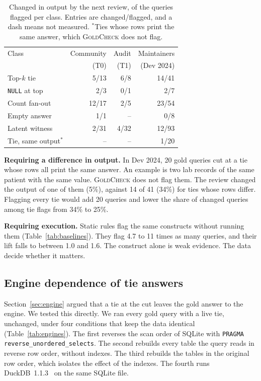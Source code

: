 \documentclass[conference]{IEEEtran}
\newcommand{\sys}{\textsc{GoldCheck}}
\begin{document}
\begin{table}[t]
\caption{Changed in output by the next review, of the queries flagged per class.
Entries are changed/flagged, and a dash means not measured. $^{*}$Ties whose rows print the same answer, which \sys{} does not flag.}
\label{tab:perclass}
\centering
\footnotesize
\setlength{\tabcolsep}{3.5pt}
\begin{tabular}{@{}lrrr@{}}
\toprule
Class & Community & Audit & Maintainers \\
 & (T0) & (T1) & (Dev 2024) \\
\midrule
Top-$k$ tie & 5/13 & 6/8 & 14/41 \\
\texttt{NULL} at top & 2/3 & 0/1 & 2/7 \\
Count fan-out & 12/17 & 2/5 & 23/54 \\
Empty answer & 1/1 & -- & 0/8 \\
\midrule
Latent witness & 2/31 & 4/32 & 12/93 \\
Tie, same output$^{*}$ & -- & -- & 1/20 \\
\bottomrule
\end{tabular}
\end{table}

\textbf{Requiring a difference in output.} In Dev 2024, 20 gold queries cut at a
tie whose rows all print the same answer. An example is two lab records of the
same patient with the same value. \sys{} does not flag them. The review changed
the output of one of them (5\%), against 14 of 41 (34\%) for ties whose rows
differ. Flagging
every tie would add 20 queries and lower the share of changed queries among tie
flags from 34\% to 25\%.

\textbf{Requiring execution.} Static rules flag the same constructs without
running them (Table~\ref{tab:baselines}). They flag 4.7 to 11 times as many
queries, and their lift falls to between 1.0 and 1.6. The construct alone is
weak evidence. The data decide whether it matters.

\subsection{Engine dependence of tie answers}
\label{sec:engines}
Section~\ref{sec:engine} argued that a tie at the cut leaves the gold answer to
the engine. We tested this directly. We ran every gold query with a live tie,
unchanged, under four conditions that keep the data identical
(Table~\ref{tab:engines}). The first reverses the scan order of SQLite with
\texttt{PRAGMA reverse\_unordered\_selects}. The second rebuilds every table the
query reads in reverse row order, without indexes. The third rebuilds the tables
in the original row order, which isolates the effect of the indexes. The fourth
runs DuckDB~1.1.3~\cite{raasveldt2019duckdb} on the same SQLite file.
\end{document}
